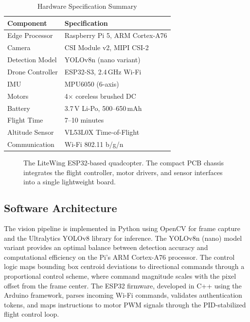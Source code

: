 \documentclass[conference]{IEEEtran}
\begin{document}
\begin{table}[!t]
\centering
\caption{Hardware Specification Summary}
\label{tab:hardware}
\begin{tabular}{ll}
\toprule
\textbf{Component} & \textbf{Specification} \\
\midrule
Edge Processor       & Raspberry Pi 5, ARM Cortex-A76 \\
Camera               & CSI Module v2, MIPI CSI-2 \\
Detection Model      & YOLOv8n (nano variant) \\
Drone Controller     & ESP32-S3, 2.4\,GHz Wi-Fi \\
IMU                  & MPU6050 (6-axis) \\
Motors               & 4$\times$ coreless brushed DC \\
Battery              & 3.7\,V Li-Po, 500--650\,mAh \\
Flight Time          & 7--10 minutes \\
Altitude Sensor      & VL53L0X Time-of-Flight \\
Communication        & Wi-Fi 802.11 b/g/n \\
\bottomrule
\end{tabular}
\end{table}

\begin{figure}[!t]
\centering
\caption{The LiteWing ESP32-based quadcopter. The compact PCB chassis integrates the flight controller, motor drivers, and sensor interfaces into a single lightweight board.}
\label{fig:drone}
\end{figure}

\subsection{Software Architecture}

The vision pipeline is implemented in Python using OpenCV for frame capture and the Ultralytics YOLOv8 library for inference. The YOLOv8n (nano) model variant provides an optimal balance between detection accuracy and computational efficiency on the Pi's ARM Cortex-A76 processor. The control logic maps bounding box centroid deviations to directional commands through a proportional control scheme, where command magnitude scales with the pixel offset from the frame center. The ESP32 firmware, developed in C++ using the Arduino framework, parses incoming Wi-Fi commands, validates authentication tokens, and maps instructions to motor PWM signals through the PID-stabilized flight control loop.
\end{document}
